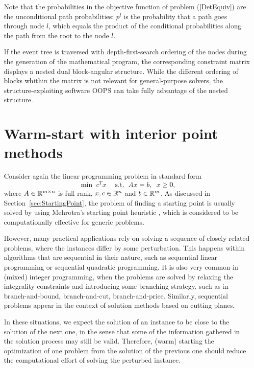 Note that the probabilities in the objective function of problem 
(\ref{DetEquiv}) are the unconditional path probabilities: $p^l$ is 
the probability that a path goes through node $l$, which equals the 
product of the conditional probabilities along the path from the root 
to the node $l$.

If the event tree is traversed with depth-first-search ordering of the 
nodes during the generation of the mathematical program, the 
corresponding constraint matrix displays a nested dual block-angular 
structure.
%
While the different ordering of blocks whithin the matrix is not 
relevant for general-purpose solvers, the
structure-exploiting software OOPS \cite{GondzioSarkissian} can take 
fully advantage of the nested structure.


%
%
\section{Warm-start with interior point methods}
\label{sec:WarmStart}

Consider again the linear programming problem in standard form
\[
\min\;  c^T x \;\quad \mbox{s.t. }\; Ax = b, \;\; x \ge 0,
\]
where $A \in \mathbb{R}^{m \times n}$ is full rank, 
$x, c \in \mathbb{R}^{n}$ and $b \in \mathbb{R}^{m}$. 
As discussed in Section~\ref{sec:StartingPoint}, the problem of 
finding a starting point is usually solved by using 
Mehrotra's starting point heuristic \cite{Mehrotra92}, which is 
considered to be computationally effective for generic problems.

However, many practical applications rely on solving a sequence 
of closely related problems, where the instances differ by some 
perturbation. This happens within algorithms that are sequential 
in their nature, such as sequential linear programming or
sequential quadratic programming.
It is also very common in (mixed) integer programming, when the
problems are solved by relaxing the integrality constraints and
introducing some branching strategy, such as in branch-and-bound,
branch-and-cut, branch-and-price.
Similarly, sequential problems appear in the context of solution 
methods based on cutting planes.

In these situations, we expect the solution of an instance to be 
close to the solution of the next one, in the sense that some of
the information gathered in the solution process may still be valid. 
Therefore, (warm) starting the 
optimization of one problem from the solution of the previous one
should reduce the computational effort of solving the perturbed instance.

